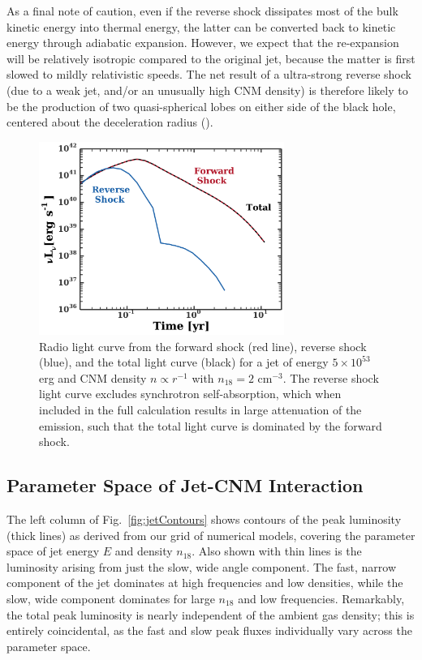 \documentclass[usenatbib,fleqn]{mnras}
\begin{document}
As a final note of caution, even if the reverse shock dissipates most
of the bulk kinetic energy into thermal energy, the latter can be
converted back to kinetic energy through adiabatic expansion.
However, we expect that the re-expansion will be relatively isotropic
compared to the original jet, because the matter is first slowed to
mildly relativistic speeds.  The net result of a ultra-strong reverse
shock (due to a weak jet, and/or an unusually high CNM density) is
therefore likely to be the production of two quasi-spherical lobes on
either side of the black hole, centered about the deceleration radius
(\citealt{Giannios&Metzger2011}).


\begin{figure}
  \includegraphics[width=8cm]{reverse.pdf}
  \caption{\label{fig:reverse} Radio light curve from the forward
    shock (red line), reverse shock (blue), and the total light curve
    (black) for a jet of energy $5\times 10^{53}$ erg and CNM density
    $n\propto r^{-1}$ with $n_{18} = 2$ cm$^{-3}$.  The reverse shock
    light curve excludes synchrotron self-absorption, which when
    included in the full calculation results in large attenuation of
    the emission, such that the total light curve is dominated by the
    forward shock.}
\end{figure}

\subsection{Parameter Space of Jet-CNM Interaction}
\label{sec:param}
The left column of Fig.~\ref{fig:jetContours} shows contours of the
peak luminosity (thick lines) as derived from our grid of numerical
models, covering the parameter space of jet energy $E$ and density
$n_{18}$.  Also shown with thin lines is the luminosity arising from
just the slow, wide angle component.  The fast, narrow component of
the jet dominates at high frequencies and low densities, while the
slow, wide component dominates for large $n_{18}$ and low frequencies.
Remarkably, the total peak luminosity is nearly independent of the
ambient gas density; this is entirely coincidental, as the fast and
slow peak fluxes individually vary across the parameter space.
\end{document}
